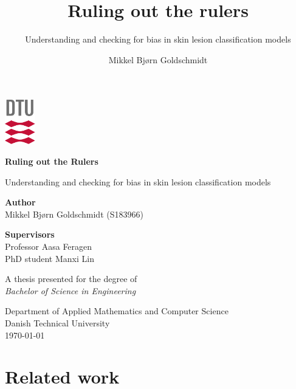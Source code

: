 \documentclass[11pt,a4paper,notitlepage]{report}
\title{Ruling out the rulers}
\subtitle{Understanding and checking for bias in skin lesion classification models}
\author{Mikkel Bjørn Goldschmidt}
\begin{document}
\begin{titlepage}
   \begin{center}
       \vspace*{1cm}
       \includegraphics[width=0.1\textwidth]{images/dtu-logo}
       \vspace*{\fill}

       \textbf{Ruling out the Rulers}

       \vspace{0.5cm}
        Understanding and checking for bias in skin lesion classification models
            
       \vspace{\fill}

       \textbf{Author}\\
       Mikkel Bjørn Goldschmidt (S183966)

       \vspace{0.4cm}

       \textbf{Supervisors}\\
       Professor Aasa Feragen\\
       PhD student Manxi Lin

       \vfill
            
       A thesis presented for the degree of\\
        \textit{Bachelor of Science in Engineering}
            
       \vspace{0.8cm}
     
            
       Department of Applied Mathematics and Computer Science\\
       Danish Technical University\\
       \today
            
   \end{center}
\end{titlepage}

\tableofcontents
\pagebreak
\renewcommand{\chaptername}{Section} 

\renewcommand{\chaptername}{Section} 
\pagebreak


\chapter{Related work}


\pagebreak
\end{document}
